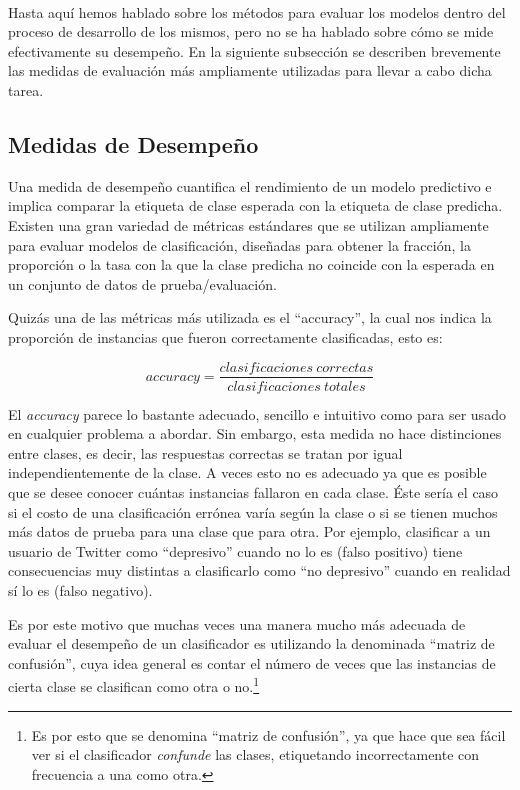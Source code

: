 \

Hasta aquí hemos hablado sobre los métodos para evaluar los modelos dentro del proceso de desarrollo de los mismos, pero no se ha hablado sobre cómo se mide efectivamente su desempeño.
En la siguiente subsección se describen brevemente las medidas de evaluación más ampliamente utilizadas para llevar a cabo dicha tarea.


\subsection{Medidas de Desempeño}
\label{sec:medidas}

Una medida de desempeño cuantifica el rendimiento de un modelo predictivo e implica comparar la etiqueta de clase esperada con la etiqueta de clase predicha.
Existen una gran variedad de métricas estándares que se utilizan ampliamente para evaluar modelos de clasificación\cite{ferri2009experimental}, diseñadas para obtener la fracción, la proporción o la tasa con la que la clase predicha no coincide con la esperada en un conjunto de datos de prueba/evaluación.

Quizás una de las métricas más utilizada es el ``accuracy'', la cual nos indica la proporción de instancias que fueron correctamente clasificadas, esto es:

\begin{equation}
accuracy = \frac{clasificaciones\ correctas}{clasificaciones\ totales}
\label{eq:accuracy}
\end{equation}

El \emph{accuracy} parece lo bastante adecuado, sencillo e intuitivo como para ser usado en cualquier problema a abordar. Sin embargo, esta medida no hace distinciones entre clases, es decir, las respuestas correctas se tratan por igual independientemente de la clase. A veces esto no es adecuado ya que es posible que se desee conocer cuántas instancias fallaron en cada clase. Éste sería el caso si el costo de una clasificación errónea varía según la clase o si se tienen muchos más datos de prueba para una clase que para otra. Por ejemplo, clasificar a un usuario de Twitter como ``depresivo'' cuando no lo es (falso positivo) tiene consecuencias muy distintas a clasificarlo como ``no depresivo'' cuando en realidad sí lo es (falso negativo).

Es por este motivo que muchas veces una manera mucho más adecuada de evaluar el desempeño de un clasificador es utilizando la denominada ``matriz de confusión'', cuya idea general es contar el número de veces que las instancias de cierta clase se clasifican como otra o no.\footnote{Es por esto que se denomina ``matriz de confusión'', ya que hace que sea fácil ver si el clasificador \emph{confunde} las clases, etiquetando incorrectamente con frecuencia a una como otra.}

